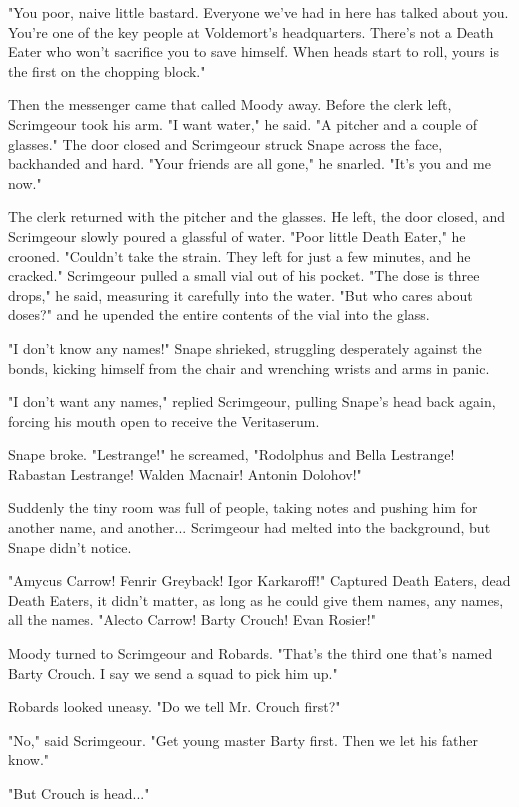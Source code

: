 "You poor, naive little bastard. Everyone we've had in here has talked about you. You're one of the key people at Voldemort's headquarters. There's not a Death Eater who won't sacrifice you to save himself. When heads start to roll, yours is the first on the chopping block."

Then the messenger came that called Moody away. Before the clerk left, Scrimgeour took his arm. "I want water," he said. "A pitcher and a couple of glasses." The door closed and Scrimgeour struck Snape across the face, backhanded and hard. "Your friends are all gone," he snarled. "It's you and me now."

The clerk returned with the pitcher and the glasses. He left, the door closed, and Scrimgeour slowly poured a glassful of water. "Poor little Death Eater," he crooned. "Couldn't take the strain. They left for just a few minutes, and he cracked." Scrimgeour pulled a small vial out of his pocket. "The dose is three drops," he said, measuring it carefully into the water. "But who cares about doses?" and he upended the entire contents of the vial into the glass.

"I don't know any names!" Snape shrieked, struggling desperately against the bonds, kicking himself from the chair and wrenching wrists and arms in panic.

"I don't want any names," replied Scrimgeour, pulling Snape's head back again, forcing his mouth open to receive the Veritaserum.

Snape broke. "Lestrange!" he screamed, "Rodolphus and Bella Lestrange! Rabastan Lestrange! Walden Macnair! Antonin Dolohov!"

Suddenly the tiny room was full of people, taking notes and pushing him for another name, and another... Scrimgeour had melted into the background, but Snape didn't notice.

"Amycus Carrow! Fenrir Greyback! Igor Karkaroff!" Captured Death Eaters, dead Death Eaters, it didn't matter, as long as he could give them names, any names, all the names. "Alecto Carrow! Barty Crouch! Evan Rosier!"

Moody turned to Scrimgeour and Robards. "That's the third one that's named Barty Crouch. I say we send a squad to pick him up."

Robards looked uneasy. "Do we tell Mr. Crouch first?"

"No," said Scrimgeour. "Get young master Barty first. Then we let his father know."

"But Crouch is head..."


